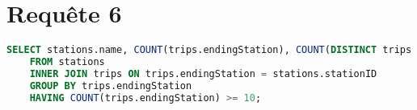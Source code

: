 \documentclass[a4paper,11pt]{report}
\begin{document}
\section{Requ\^ete 6}
    \begin{lstlisting}[language=sql]
    SELECT stations.name, COUNT(trips.endingStation), COUNT(DISTINCT trips.userID)
    FROM stations
    INNER JOIN trips ON trips.endingStation = stations.stationID
    GROUP BY trips.endingStation
    HAVING COUNT(trips.endingStation) >= 10;
    \end{lstlisting}
\end{document}
